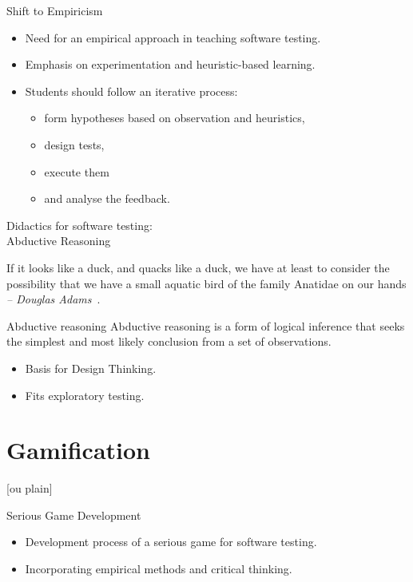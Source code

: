 \documentclass[aspectratio=169]{beamer}
\begin{document}
\begin{frame}{Shift to Empiricism}
    \begin{itemize}
        \item Need for an empirical approach in teaching software testing.
        \item Emphasis on experimentation and heuristic-based learning.
        \item Students should follow an iterative process:
        \begin{itemize}
            \item form hypotheses based on observation and heuristics, 
            \item design tests, 
            \item execute them 
            \item and analyse the feedback.
        \end{itemize}
    \end{itemize}
\end{frame}

\begin{frame}{Didactics for software testing: \\Abductive Reasoning}
    \begin{blockquote}
    If it looks like a duck, and quacks like a duck, we have at least to consider the possibility that we have a small aquatic bird of the family Anatidae on our hands\\
    \textit{-- Douglas Adams}~\cite{adams1987dirk}.
    \end{blockquote}
\end{frame}

\begin{frame}{Abductive reasoning}
    Abductive reasoning is a form of logical inference that seeks the simplest and most likely conclusion from a set of observations.~\cite{ContributorstoWikimediaprojects2024Feb} 
    \begin{itemize}
        \item Basis for Design Thinking.
        \item Fits exploratory testing.
    \end{itemize}
\end{frame}

\section{Gamification}

[ou plain]
\begin{frame}{Serious Game Development}
    \begin{itemize}
        \item Development process of a serious game for software testing.
        \item Incorporating empirical methods and critical thinking.
    \end{itemize}
\end{frame}
\end{document}
